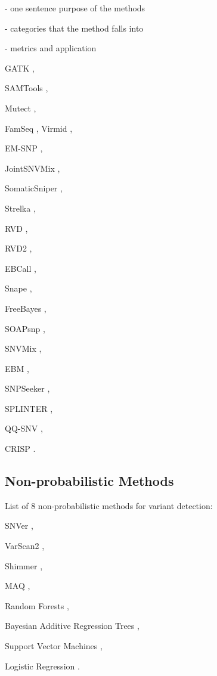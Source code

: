 \documentclass[11pt,reqno]{amsart}
\begin{document}
- one sentence purpose of the methods

- categories that the method falls into

- metrics and application

GATK \citep{McKenna2010},



SAMTools \citep{Li2009a},

Mutect \citep{Cibulskis2013},

FamSeq \citep{Peng2013},
Virmid \citep{Kim2013},

EM-SNP \citep{Chen2013},

JointSNVMix \citep{Roth2012},

SomaticSniper \citep{Larson2012},

Strelka \citep{Saunders2012},

RVD \citep{Flaherty2012},

RVD2 \citep{He2015},

EBCall \citep{Shiraishi2013},

Snape \citep{Raineri2012},

FreeBayes \citep{Garrison2012},

SOAPsnp \citep{Li2009},

SNVMix \citep{Goya2010},

EBM \citep{Zhou2012},

SNPSeeker \citep{Druley2009},

SPLINTER \citep{Spencer2014},

QQ-SNV \citep{VanderBorght2015},

CRISP \citep{Bansal2010}.

\subsection{Non-probabilistic Methods}
List of 8 non-probabilistic methods for variant detection:

SNVer \citep{Wei2011},

VarScan2 \citep{Koboldt2012},

Shimmer \citep{Hansen2013},

MAQ \citep{Li2008},

Random Forests \citep{Ding2012},

Bayesian Additive Regression Trees \citep{Ding2012},

Support Vector Machines \citep{Ding2012},

Logistic Regression \citep{Ding2012}.




\end{document}

